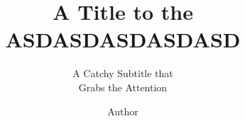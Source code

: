 \documentclass[
    11pt,
    oneside,
    doublespace
]{tudat}
\begin{document}

    \frontmatter

    \title{A Title to the ASDASDASDASDASD}
    \subtitle{A Catchy Subtitle that \\ Grabs the Attention} %
    \author{Author}
    \subject{AB1234: Course Name}


    \makecover

    \frontmatter %

    
    \listoffigures
    \listoftables

    \newpage

    \setcounter{tocdepth}{2} %
    \tableofcontents

    \mainmatter %

    
    
    
    
    
    
    
    

    \newpage

    \backmatter

    \appendix
    
    
\end{document}

